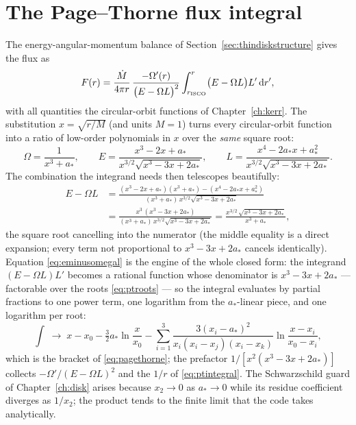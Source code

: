 \section{The Page--Thorne flux integral}
\label{app:pagethorne}

The energy-angular-momentum balance of
Section~\ref{sec:thindiskstructure} gives the flux as
\begin{equation}
F(r) = \frac{\dot M}{4\pi r}\,
\frac{-\Omega'(r)}{\bigl(E - \Omega L\bigr)^2}
\int_{r_{\rm ISCO}}^{r}\bigl(E - \Omega L\bigr)L'\,\mathrm{d}r',
\label{eq:ptintegral}
\end{equation}
with all quantities the circular-orbit functions of
Chapter~\ref{ch:kerr}. The substitution $x = \sqrt{r/M}$ (and units
$M = 1$) turns every circular-orbit function into a ratio of low-order
polynomials in $x$ over the \emph{same} square root:
\begin{equation}
\Omega = \frac{1}{x^3 + a_*},
\qquad
E = \frac{x^3 - 2x + a_*}{x^{3/2}\sqrt{x^3 - 3x + 2a_*}},
\qquad
L = \frac{x^4 - 2a_* x + a_*^2}{x^{3/2}\sqrt{x^3 - 3x + 2a_*}} .
\label{eq:ptcircx}
\end{equation}
The combination the integrand needs then telescopes beautifully:
\begin{align}
E - \Omega L
&= \frac{(x^3 - 2x + a_*)(x^3 + a_*) - (x^4 - 2a_*x + a_*^2)}
{(x^3 + a_*)\,x^{3/2}\sqrt{x^3 - 3x + 2a_*}} \nonumber\\
&= \frac{x^3\,(x^3 - 3x + 2a_*)}
{(x^3 + a_*)\,x^{3/2}\sqrt{x^3 - 3x + 2a_*}}
= \frac{x^{3/2}\,\sqrt{x^3 - 3x + 2a_*}}{x^3 + a_*} ,
\label{eq:eminusomegal}
\end{align}
the square root cancelling into the numerator (the middle equality is
a direct expansion; every term not proportional to
$x^3 - 3x + 2a_*$ cancels identically). Equation
\eqref{eq:eminusomegal} is the engine of the whole closed form: the
integrand $(E - \Omega L)L'$ becomes a rational function whose
denominator is $x^3 - 3x + 2a_*$ — factorable over the roots
\eqref{eq:ptroots} — so the integral evaluates by partial fractions to
one power term, one logarithm from the $a_*$-linear piece, and one
logarithm per root:
\begin{equation}
\int \;\longrightarrow\;
x - x_0 - \tfrac32 a_*\ln\frac{x}{x_0}
- \sum_{i=1}^{3}
\frac{3(x_i - a_*)^2}{x_i(x_i - x_j)(x_i - x_k)}
\ln\frac{x - x_i}{x_0 - x_i},
\end{equation}
which is the bracket of \eqref{eq:pagethorne}; the prefactor
$1/[x^2(x^3 - 3x + 2a_*)]$ collects
$-\Omega'/(E - \Omega L)^2$ and the $1/r$ of \eqref{eq:ptintegral}.
The Schwarzschild guard of Chapter~\ref{ch:disk} arises because
$x_2 \to 0$ as $a_* \to 0$ while its residue coefficient diverges as
$1/x_2$; the product tends to the finite limit that the code takes
analytically.

